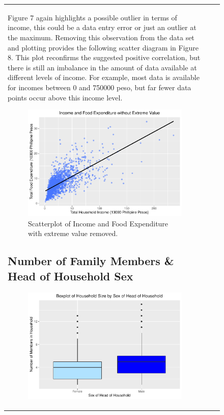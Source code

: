 \documentclass[
]{article}
\begin{document}
\begin{figure}[H]
\begin{table}[H]
\begin{tabular}[t]{lrr}
Figure 7 again highlights a possible outlier in terms of income, this
could be a data entry error or just an outlier at the maximum. Removing
this observation from the data set and plotting provides the following
scatter diagram in Figure 8. This plot reconfirms the suggested positive
correlation, but there is still an imbalance in the amount of data
available at different levels of income. For example, most data is
available for incomes between 0 and 750000 peso, but far fewer data
points occur above this income level.

\begin{figure}[H]

{\centering \includegraphics[width=0.8\linewidth]{Group_01_Project2_demo_files/figure-latex/balance without outlier-1} 

}

\caption{Scatterplot of Income and Food Expenditure with extreme value removed.}\label{fig:balance without outlier}
\end{figure}

\hypertarget{number-of-family-members-head-of-household-sex}{%
\subsection{Number of Family Members \& Head of Household
Sex}\label{number-of-family-members-head-of-household-sex}}

\begin{figure}[H]

{\centering \includegraphics[width=0.8\linewidth]{Group_01_Project2_demo_files/figure-latex/boxplot of sex and members-1} 

}
\end{figure}
\end{tabular}
\end{table}
\end{figure}
\end{document}
